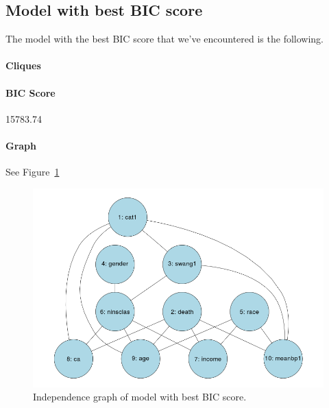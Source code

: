 \documentclass[12pt]{article}
\theoremstyle{definition}
\begin{document}
\subsection*{Model with best BIC score}
The model with the best BIC score that we've encountered is the following.

\paragraph{Cliques}

\paragraph{BIC Score} 15783.74

\paragraph{Graph} See Figure~\ref{fig:bic_best}

\begin{figure}[H]
    \centering
    \includegraphics[width=0.8\linewidth]{bic_best.png}
    \caption{Independence graph of model with best BIC score.}
\label{fig:bic_best}
\end{figure}
\end{document}
